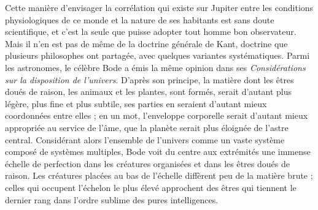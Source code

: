 \documentclass[a4paper, 11pt, oneside]{article}
\begin{document}
Cette manière d'envisager la corrélation qui existe sur Jupiter entre les conditions physiologiques de ce monde et la nature de ses habitants est sans doute scientifique, et c'est la seule que puisse adopter tout homme bon observateur. Mais il n'en est pas de même de la doctrine générale de Kant, doctrine que plusieurs philosophes ont partagée, avec quelques variantes systématiques. Parmi les astronomes, le célèbre Bode a émis la même opinion dans ses \emph{Considérations sur la disposition de l'univers}. D'après son principe, la matière dont les êtres doués de raison, les animaux et les plantes, sont formés, serait d'autant plus légère, plus fine et plus subtile, ses parties en seraient d'autant mieux coordonnées entre elles ; en un mot, l'enveloppe corporelle serait d'autant mieux appropriée au service de l'âme, que la planète serait plus éloignée de l'astre central. Considérant alors l'ensemble de l'univers comme un vaste système composé de systèmes multiples, Bode voit du centre aux extrémités une immense échelle de perfection dans les créatures organisées et dans les êtres doués de raison. Les créatures placées au bas de l'échelle diffèrent peu de la matière brute ; celles qui occupent l'échelon le plus élevé approchent des êtres qui tiennent le dernier rang dans l'ordre sublime des pures intelligences.
\end{document}
